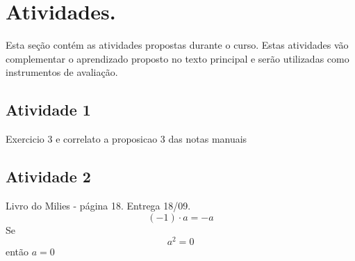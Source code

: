 \documentclass[a4paper,12pt]{article}
\begin{document}

\section{Atividades.}

Esta seção contém as atividades propostas durante o curso. Estas atividades vão complementar o aprendizado proposto no texto principal e serão utilizadas como instrumentos de avaliação.

\subsection{Atividade 1}

Exercicio 3 e correlato a proposicao 3 das notas manuais

\subsection{Atividade 2}

Livro do Milies - página 18. Entrega 18/09.
\begin{equation} %
  (-1) \cdot a = -a
\end{equation}
Se 
\begin{equation} %
  a^2 = 0
\end{equation}
então $a = 0$

\nocite{*}


\end{document}
